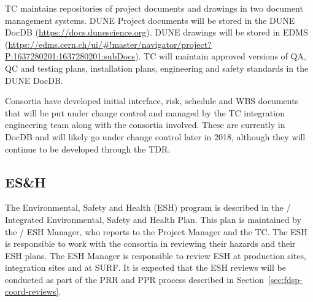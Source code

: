 TC maintains repositories of project documents and drawings in two
document management systems.  DUNE Project documents will be stored in
the DUNE DocDB (\url{https://docs.dunescience.org}). DUNE drawings
will be stored in EDMS
(\url{https://edms.cern.ch/ui/#!master/navigator/project?P:1637280201:1637280201:subDocs}).
TC will maintain approved versions of QA, QC and testing plans,
installation plans, engineering and safety standards in the DUNE
DocDB.

Consortia have developed initial interface, risk, schedule and WBS
documents that will be put under change control and managed by the TC
integration engineering team along with the consortia involved. These
are currently in DocDB and will likely go under change control later
in 2018, although they will continue to be developed through the TDR.


\subsection{ES\&H}
\label{sec:fdsp-coord-esh}

The  Environmental, Safety and Health (ESH) program is
described in the / Integrated Environmental,
Safety and Health Plan. This plan is maintained by the
/ ESH Manager, who reports to the 
Project Manager and the TC. The ESH is responsible to work with the
consortia in reviewing their hazards and their ESH plans.  The ESH
Manager is responsible to review ESH at production sites, integration
sites and at SURF. It is expected that the ESH reviews will be
conducted as part of the PRR and PPR process described in
Section~\ref{sec:fdsp-coord-reviews}.

